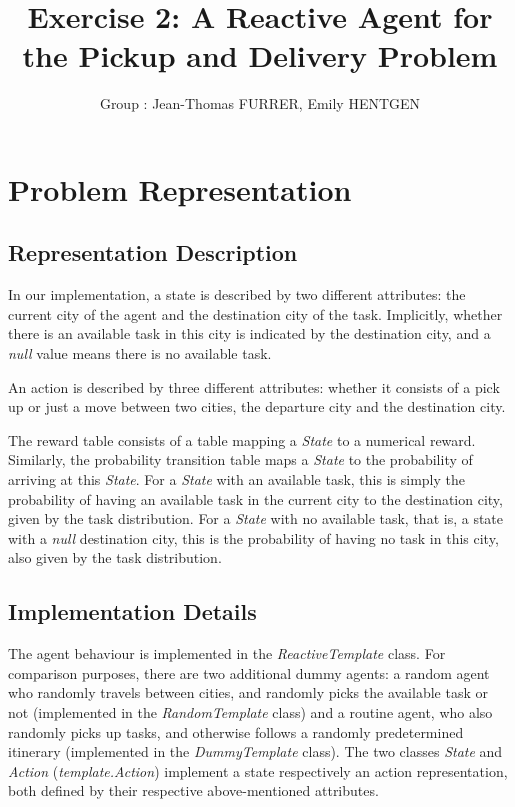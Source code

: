 \documentclass[10pt]{article}
\title{\bf Exercise 2: A Reactive Agent for the Pickup and Delivery Problem}
\author{Group \textnumero 23: Jean-Thomas FURRER, Emily HENTGEN}
\begin{document}
\maketitle

\section{Problem Representation}

\subsection{Representation Description}

In our implementation, a state is described by two different attributes:
the current city of the agent and the destination city of the task. Implicitly, whether there is an available task in this city is indicated by the destination city, and a \textit{null} value means there is no available task.

An action is described by three different attributes: whether it consists of a pick up or just a move between two cities, the departure city and the destination city.

The reward table consists of a table mapping a \textit{State} to a numerical reward. Similarly, the probability transition table maps a \textit{State} to the probability of arriving at this \textit{State}.
For a \textit{State} with an available task, this is simply the probability of having an available task in the current city to the destination city, given by the task distribution.
For a \textit{State} with no available task, that is, a state with a \textit{null} destination city, this is the probability of having no task in this city, also given by the task distribution.

\subsection{Implementation Details}

The agent behaviour is implemented in the \textit{ReactiveTemplate} class. For comparison purposes, there are two additional dummy agents: a random agent who randomly travels between cities, and randomly picks the available task or not (implemented in the \textit{RandomTemplate} class) and a routine agent, who also randomly picks up tasks, and otherwise follows a randomly predetermined itinerary (implemented in the \textit{DummyTemplate} class).
The two classes \textit{State} and \textit{Action} (\textit{template.Action}) implement a state respectively an action representation, both defined by their respective above-mentioned attributes.
\end{document}
